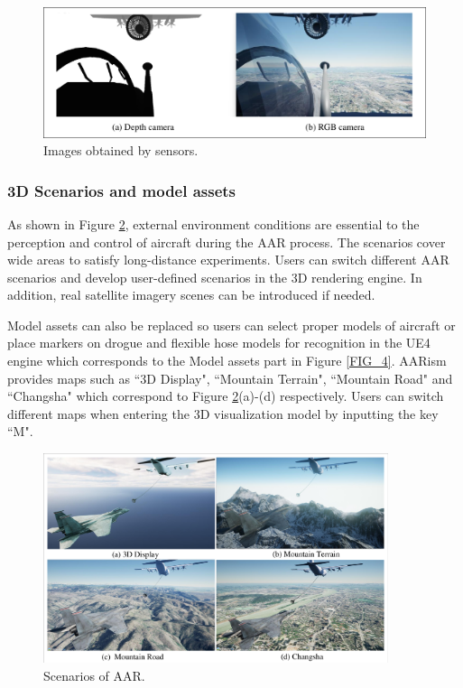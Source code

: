 \begin{figure}[th]
	\centering
	\includegraphics[width=1
	\textwidth]{Figures/Figs_Ch5/Fig12.pdf}
	\caption{Images obtained by sensors.}\label{FIG_12}
\end{figure}

\subsubsection{3D Scenarios and model assets }\label{sec4.2.3}
As shown in Figure \ref{FIG_13}, external environment conditions are essential to the perception and control of aircraft during the AAR process. The scenarios cover wide areas to satisfy long-distance experiments. Users can switch different AAR scenarios and develop user-defined scenarios in the 3D rendering engine. In addition, real satellite imagery scenes can be introduced if needed.

Model assets can also be replaced so users can select proper models of aircraft or place markers on drogue and flexible hose models for recognition in the UE4 engine which corresponds to the Model assets part in Figure \ref{FIG_4}. AARism provides maps such as ``3D Display", ``Mountain Terrain", ``Mountain Road" and ``Changsha" which correspond to  Figure \ref{FIG_13}(a)-(d) respectively. Users can switch different maps when entering the 3D visualization model by inputting the key ``M". 

\begin{figure}[th]
	\centering
	\includegraphics[width=0.9\textwidth]{Figures/Figs_Ch5/Fig13.pdf}
	\caption{Scenarios of AAR.}\label{FIG_13}
\end{figure}


